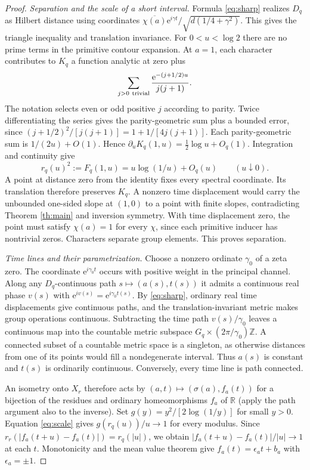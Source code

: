 \documentclass[11pt]{article}
\newcommand{\R}{\mathbb R}
\newcommand{\Z}{\mathbb Z}
\newcommand{\e}{\mathrm e}
\begin{document}
\begin{proof}
\emph{Separation and the scale of a short interval.}
Formula \eqref{eq:sharp} realizes $D_q$ as Hilbert distance using coordinates
$\overline{\chi(a)}\e^{i\gamma t}/\sqrt{d(1/4+\gamma^2)}$. This gives the triangle inequality and translation invariance. For $0<u<\log 2$ there are no prime terms in the primitive contour expansion. At $a=1$, each character contributes to $K_q$ a function analytic at zero plus
\[
 \sum_{j>0\ {\rm trivial}}\frac{\e^{-(j+1/2)u}}{j(j+1)} .
\]
The notation selects even or odd positive $j$ according to parity. Twice differentiating the series gives the parity-geometric sum plus a bounded error, since $(j+1/2)^2/[j(j+1)]=1+1/[4j(j+1)]$. Each parity-geometric sum is $1/(2u)+O(1)$. Hence $\partial_uK_q(1,u)=\tfrac12\log u+O_q(1)$. Integration and continuity give
\begin{equation}
 r_q(u)^2:=F_q(1,u)=u\log(1/u)+O_q(u)\qquad(u\downarrow0).\label{eq:scale}
\end{equation}
A point at distance zero from the identity fixes every spectral coordinate. Its translation therefore preserves $K_q$. A nonzero time displacement would carry the unbounded one-sided slope at $(1,0)$ to a point with finite slopes, contradicting Theorem \ref{th:main} and inversion symmetry. With time displacement zero, the point must satisfy $\chi(a)=1$ for every $\chi$, since each primitive inducer has nontrivial zeros. Characters separate group elements. This proves separation.

\emph{Time lines and their parametrization.}
Choose a nonzero ordinate $\gamma_0$ of a zeta zero. The coordinate $\e^{i\gamma_0t}$ occurs with positive weight in the principal channel. Along any $D_q$-continuous path $s\mapsto(a(s),t(s))$ it admits a continuous real phase $v(s)$ with $\e^{iv(s)}=\e^{i\gamma_0t(s)}$. By \eqref{eq:sharp}, ordinary real time displacements give continuous paths, and the translation-invariant metric makes group operations continuous. Subtracting the time path $v(s)/\gamma_0$ leaves a continuous map into the countable metric subspace $G_q\times(2\pi/\gamma_0)\Z$. A connected subset of a countable metric space is a singleton, as otherwise distances from one of its points would fill a nondegenerate interval. Thus $a(s)$ is constant and $t(s)$ is ordinarily continuous. Conversely, every time line is path connected.

An isometry onto $X_r$ therefore acts by $(a,t)\mapsto(\sigma(a),f_a(t))$ for a bijection of the residues and ordinary homeomorphisms $f_a$ of $\R$ (apply the path argument also to the inverse). Set $g(y)=y^2/[2\log(1/y)]$ for small $y>0$. Equation \eqref{eq:scale} gives $g(r_q(u))/u\to1$ for every modulus. Since $r_r(|f_a(t+u)-f_a(t)|)=r_q(|u|)$, we obtain $|f_a(t+u)-f_a(t)|/|u|\to1$ at each $t$. Monotonicity and the mean value theorem give $f_a(t)=\epsilon_a t+b_a$ with $\epsilon_a=\pm1$.


\end{proof}
\end{document}
